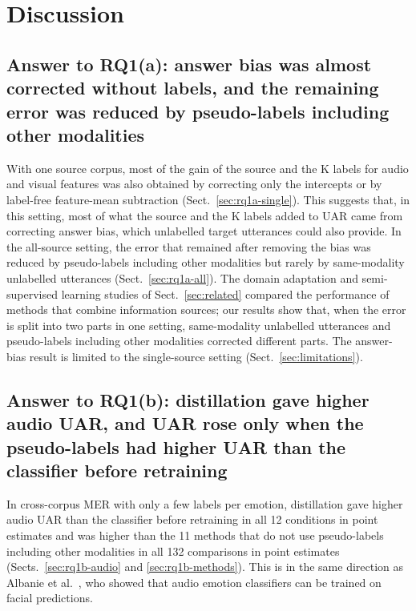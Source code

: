 \FloatBarrier
\section{Discussion}\label{sec:discussion}

\subsection{Answer to RQ1(a): answer bias was almost corrected without labels, and the remaining error was reduced by pseudo-labels including other modalities}\label{sec:disc-rq1a}
With one source corpus, most of the gain of the source and the K labels for audio and visual features was also obtained by correcting only the intercepts or by label-free feature-mean subtraction (Sect.~\ref{sec:rq1a-single}). This suggests that, in this setting, most of what the source and the K labels added to UAR came from correcting answer bias, which unlabelled target utterances could also provide. In the all-source setting, the error that remained after removing the bias was reduced by pseudo-labels including other modalities but rarely by same-modality unlabelled utterances (Sect.~\ref{sec:rq1a-all}). The domain adaptation and semi-supervised learning studies of Sect.~\ref{sec:related} compared the performance of methods that combine information sources; our results show that, when the error is split into two parts in one setting, same-modality unlabelled utterances and pseudo-labels including other modalities corrected different parts. The answer-bias result is limited to the single-source setting (Sect.~\ref{sec:limitations}).

\subsection{Answer to RQ1(b): distillation gave higher audio UAR, and UAR rose only when the pseudo-labels had higher UAR than the classifier before retraining}\label{sec:disc-rq1b}
In cross-corpus MER with only a few labels per emotion, distillation gave higher audio UAR than the classifier before retraining in all 12 conditions in point estimates and was higher than the 11 methods that do not use pseudo-labels including other modalities in all 132 comparisons in point estimates (Sects.~\ref{sec:rq1b-audio} and \ref{sec:rq1b-methods}). This is in the same direction as Albanie et al.\ \cite{albanie2018}, who showed that audio emotion classifiers can be trained on facial predictions.


